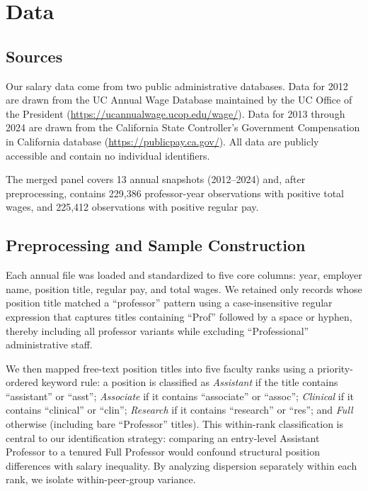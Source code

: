 \documentclass[12pt]{article}
\begin{document}
\section{Data}
\label{sec:data}

\subsection{Sources}

Our salary data come from two public administrative databases. Data for
2012 are drawn from the UC Annual Wage Database maintained by the UC
Office of the President (\url{https://ucannualwage.ucop.edu/wage/}).
Data for 2013 through 2024 are drawn from the California State
Controller's Government Compensation in California database
(\url{https://publicpay.ca.gov/}). All data are publicly accessible and
contain no individual identifiers.

The merged panel covers 13 annual snapshots (2012--2024) and, after
preprocessing, contains 229,386 professor-year observations with
positive total wages, and 225,412 observations with positive regular pay.

\subsection{Preprocessing and Sample Construction}

Each annual file was loaded and standardized to five core columns: year,
employer name, position title, regular pay, and total wages. We retained
only records whose position title matched a ``professor'' pattern using
a case-insensitive regular expression that captures titles containing
``Prof'' followed by a space or hyphen, thereby including all professor
variants while excluding ``Professional'' administrative staff.

We then mapped free-text position titles into five faculty ranks using a
priority-ordered keyword rule: a position is classified as
\textit{Assistant} if the title contains ``assistant'' or ``asst'';
\textit{Associate} if it contains ``associate'' or ``assoc'';
\textit{Clinical} if it contains ``clinical'' or ``clin'';
\textit{Research} if it contains ``research'' or ``res''; and
\textit{Full} otherwise (including bare ``Professor'' titles). This
within-rank classification is central to our identification strategy:
comparing an entry-level Assistant Professor to a tenured Full Professor
would confound structural position differences with salary inequality. By
analyzing dispersion separately within each rank, we isolate
within-peer-group variance.
\end{document}
